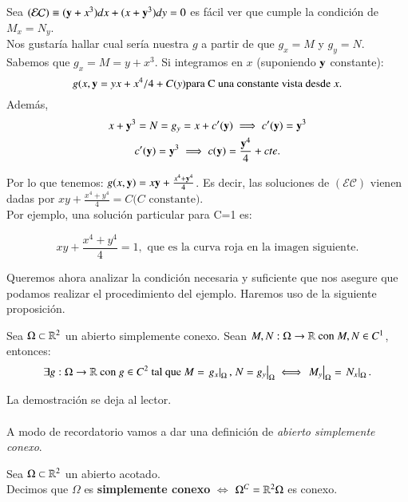 \begin{eg}
    Sea $\mathcal{(EC)} \equiv (\mathbf{y}+x^3) dx + (x+\mathbf{y}^3) dy = 0$ es fácil ver que cumple la condición de $M_x = N_y$.\\
    Nos gustaría hallar cual sería nuestra $g$ a partir de que $g_x=M$ y $g_y=N$. Sabemos que $g_x = M = y + x^3$.
    Si integramos en $x$ (suponiendo $\mathbf{y}$ constante):
    $$
    g(x,\mathbf{y} = yx + x^4/4 + C(y) \text{para C una constante vista desde $x$}.
    $$
    Además,
    \begin{gather*}
        x+\mathbf{y}^3 = N = g_y = x + c'(\mathbf{y}) \implies c'(\mathbf{y}) = \mathbf{y}^3\\
        c'(\mathbf{y}) = \mathbf{y}^3 \implies c(\mathbf{y}) = \frac{\mathbf{y}^4}{4} + cte.
    \end{gather*}

    Por lo que tenemos: $g(x,\mathbf{y}) = x\mathbf{y} + \frac{x^4+\mathbf{y}^4}{4}$. Es decir, las soluciones de $\mathcal{(EC)}$ vienen dadas por $xy + \frac{x^4+y^4}{4} = C \text{($C$ constante)}$.\\

    Por ejemplo, una solución particular para C=1 es:

    $$xy + \frac{x^4+y^4}{4} = 1, \text{ que es la curva roja en la imagen siguiente.}$$
    \begin{center}
    \end{center}
\end{eg}

Queremos ahora analizar la condición necesaria y suficiente que nos asegure que podamos realizar el procedimiento del ejemplo. Haremos uso de la siguiente proposición.
\begin{pro}
Sea $\Omega\subset\mathbb{R}^2$ un abierto simplemente conexo. Sean $M, N : \Omega \to \mathbb{R}\text{ con } M,N \in C^1$, entonces:
$$
\exists g : \Omega \to \mathbb{R} \text{ con } g \in C^2 \text{ tal que } M = \left.g_x\right|_\Omega, \left.N=g_y\right|_\Omega \iff \left.M_y\right|_\Omega = \left.N_x\right|_\Omega.
    $$
\end{pro}
La demostración se deja al lector.\\\\
A modo de recordatorio vamos a dar una definición de \textit{abierto simplemente conexo}.
\begin{dfn}
    Sea $\Omega \subset \mathbb{R}^2$ un abierto acotado.\\
    Decimos que $\Omega$ es \textbf{simplemente conexo} $\iff$ $\Omega^C = \mathbb{R}^2\Omega$ es conexo.
\end{dfn}

